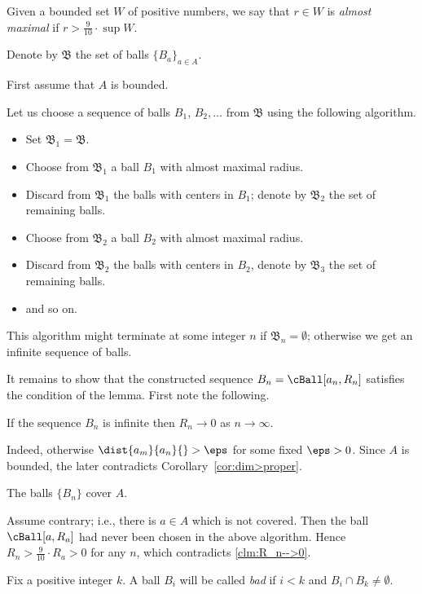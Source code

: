 Given a bounded set $W$ of positive numbers, 
we say that $r\in W$ is \emph{almost maximal} if $r>\tfrac9{10}\cdot \sup W$.

Denote by $\mathfrak{B}$ the set of balls $\{B_a\}_{a\in A}$.

First assume that $A$ is bounded.

Let us choose a sequence of balls $B_1$, $B_2,\dots$ from $\mathfrak{B}$ using the following algorithm.
\begin{itemize}
\item Set $\mathfrak{B}_1=\mathfrak{B}$.
\item Choose from $\mathfrak{B}_1$ a ball $B_1$ with almost maximal radius.
\item Discard from $\mathfrak{B}_1$ the balls with centers in $B_1$;
denote by $\mathfrak{B}_2$ the set of remaining balls.
\item Choose from $\mathfrak{B}_2$ a ball $B_2$ with almost maximal radius.
\item Discard from $\mathfrak{B}_2$ the balls with centers in $B_2$,
denote by $\mathfrak{B}_3$ the set of remaining balls.
\item and so on.
\end{itemize}
This algorithm might terminate at some integer $n$ if $\mathfrak{B}_n=\emptyset$; otherwise we get an infinite sequence of balls.

It remains to show that the constructed sequence $B_n=\cBall[a_n,R_n]$ satisfies the condition of the lemma.
First note the following.

\begin{clm}{}\label{clm:R_n-->0} If the sequence $B_n$ is infinite then $R_n\to0$ as $n\to\infty$.
\end{clm}

Indeed, otherwise $\dist{a_m}{a_n}{}>\eps$ for some fixed $\eps>0$.
Since $A$ is bounded, the later contradicts Corollary~\ref{cor:dim>proper}.\claimqeds


\begin{clm}{}
The balls $\{B_n\}$ cover $A$.
\end{clm}

Assume contrary; 
i.e., there is $a\in A$ which is not covered. 
Then 
the ball $\cBall[a,R_a]$ had never been chosen in the above algorithm.
Hence $R_n>\tfrac{9}{10}\cdot R_a>0$ for any $n$,
which contradicts \ref{clm:R_n-->0}.\claimqeds

Fix a positive integer $k$.
A ball $B_i$ will be called \emph{bad}
if $i<k$ and $B_i\cap B_k\ne \emptyset$. 


